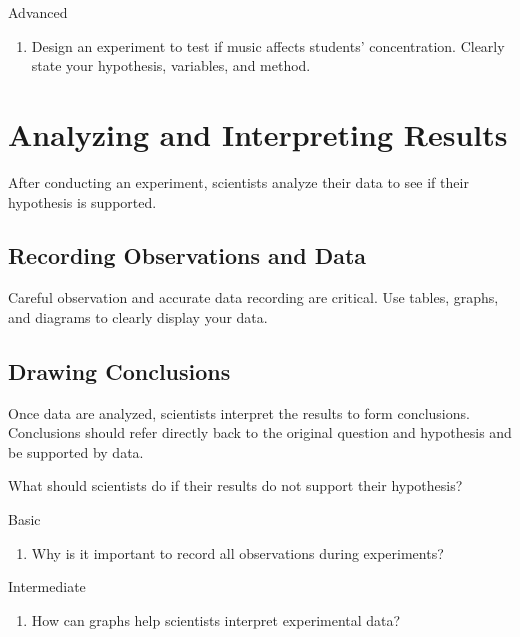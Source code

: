 \begin{tieredquestions}{Advanced}
\begin{enumerate}
    \item Design an experiment to test if music affects students' concentration. Clearly state your hypothesis, variables, and method.
\end{enumerate}
\end{tieredquestions}

\section{Analyzing and Interpreting Results}

After conducting an experiment, scientists analyze their data to see if their hypothesis is supported.

\subsection{Recording Observations and Data}

Careful observation and accurate data recording are critical. Use tables, graphs, and diagrams to clearly display your data.

\subsection{Drawing Conclusions}

Once data are analyzed, scientists interpret the results to form conclusions. Conclusions should refer directly back to the original question and hypothesis and be supported by data.

\begin{stopandthink}
What should scientists do if their results do not support their hypothesis?
\end{stopandthink}


\begin{tieredquestions}{Basic}
\begin{enumerate}
    \item Why is it important to record all observations during experiments?
\end{enumerate}
\end{tieredquestions}

\begin{tieredquestions}{Intermediate}
\begin{enumerate}
    \item How can graphs help scientists interpret experimental data?
\end{enumerate}
\end{tieredquestions}

